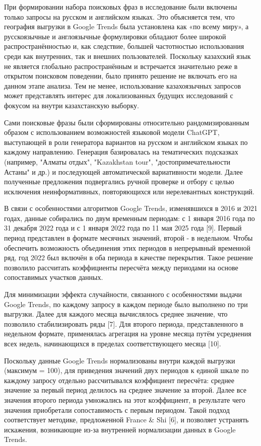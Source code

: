 При формировании набора поисковых фраз в исследование были включены
только запросы на русском и английском языках. Это объясняется тем, что
география выгрузки в Google Trends была установлена как «по всему миру»,
а русскоязычные и англоязычные формулировки обладают более широкой
распространённостью и, как следствие, большей частотностью использования
среди как внутренних, так и внешних пользователей. Поскольку казахский
язык не является глобально распространённым и встречается значительно
реже в открытом поисковом поведении, было принято решение не включать
его на данном этапе анализа. Тем не менее, использование казахоязычных
запросов может представлять интерес для локализованных будущих
исследований с фокусом на внутри казахстанскую выборку.

Сами поисковые фразы были сформированы относительно рандомизированным
образом с использованием возможностей языковой модели ChatGPT,
выступающей в роли генератора вариантов на русском и английском языках
по каждому направлению. Генерация базировалась на тематических
подсказках (например, "Алматы отдых", "Kazakhstan tour",
"достопримечательности Астаны" и др.) и последующей автоматической
вариативности модели. Далее полученные предложения подвергались ручной
проверке и отбору с целью исключения неинформативных, повторяющихся или
нерелевантных конструкций.

В связи с особенностями алгоритмов Google Trends, изменявшихся в 2016 и
2021 годах, данные собирались по двум временным периодам: с 1 января
2016 года по 31 декабря 2022 года и с 1 января 2022 года по 11 мая 2025
года {[}9{]}. Первый период представлен в формате месячных значений,
второй - в недельном. Чтобы обеспечить возможность объединения этих
периодов в непрерывный временной ряд, год 2022 был включён в оба периода
в качестве перекрытия. Такое решение позволило рассчитать коэффициенты
пересчёта между периодами на основе сопоставимых участков данных.

Для минимизации эффекта случайности, связанного с особенностями выдачи
Google Trends, по каждому запросу в каждом периоде было выполнено по три
выгрузки. Далее для каждого месяца вычислялось среднее значение, что
позволило стабилизировать ряды {[}7{]}. Для второго периода,
представленного в недельном формате, применялась агрегация на уровне
месяца путём усреднения всех недель, начинающихся в пределах
соответствующего месяца {[}10{]}.

Поскольку данные Google Trends нормализованы внутри каждой выгрузки
(максимум = 100), для приведения значений двух периодов к единой шкале
по каждому запросу отдельно рассчитывался коэффициент пересчёта: среднее
значение за первый период делилось на среднее значение за второй. Далее
все значения второго периода умножались на этот коэффициент, в
результате чего значения приобретали сопоставимость с первым периодом.
Такой подход соответствует методике, предложенной France \& Shi {[}6{]},
и позволяет устранять искажения, возникающие из-за внутренней
нормализации данных в Google Trends.

